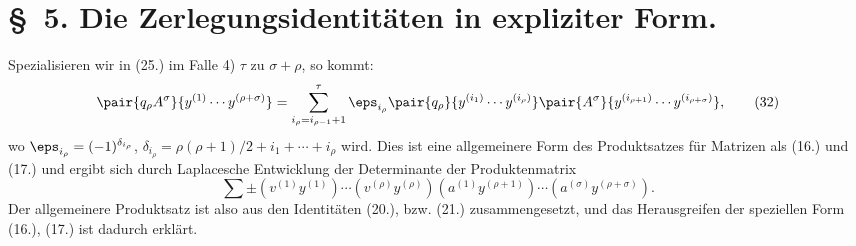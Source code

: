 \section*{\S\ 5. Die Zerlegungsidentit\"aten in expliziter Form.}
Spezialisieren wir in (25.) im Falle 4) $\tau$ zu $\sigma+\rho$, so kommt:
\begin{equation}
 \pair{q_\rho A^\sigma}{y^{(1)}\cdots y^{(\rho+\sigma)}}
 =\sum_{i_\rho=i_{\rho-1}+1}^{\tau}
 \eps_{i_\rho}\pair{q_\rho}{y^{(i_1)}\cdots y^{(i_\rho)}}
 \pair{A^\sigma}{y^{(i_{\rho+1})}\cdots y^{(i_{\rho+\sigma})}},
\tag{32}
\end{equation}
wo $\eps_{i_\rho}=(-1)^{\delta_{i_\rho}}$, $\delta_{i_\rho}=\rho(\rho+1)/2+i_1+\cdots+i_\rho$ wird. Dies ist eine allgemeinere Form des Produktsatzes f\"ur Matrizen als (16.) und (17.) und ergibt sich durch Laplacesche Entwicklung der Determinante der Produktenmatrix
\[
 \sum\pm(v^{(1)}y^{(1)})\cdots(v^{(\rho)}y^{(\rho)})(a^{(1)}y^{(\rho+1)})\cdots(a^{(\sigma)}y^{(\rho+\sigma)}).
\]
Der allgemeinere Produktsatz ist also aus den Identit\"aten (20.), bzw. (21.) zusammengesetzt, und das Herausgreifen der speziellen Form (16.), (17.) ist dadurch erkl\"art.
